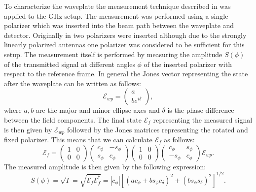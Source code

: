 To characterize the waveplate the measurement technique described in \cite{Masson2006} was applied to the GHz setup. The measurement was performed using a single polarizer which was inserted into the beam path between the waveplate and detector. Originally in \cite{Masson2006} two polarizers were inserted although due to the strongly linearly polarized antennas one polarizer was considered to be sufficient for this setup. The measurement itself is performed by measuring the amplitude $S(\phi)$ of the transmitted signal at different angles $\phi$ of the inserted polarizer with respect to the reference frame. In general the Jones vector representing the state after the waveplate can be written as follows:
\begin{equation}
    \bm{\mathcal{E}}_{wp}= 
    \begin{pmatrix}
    a \\
    be^{i\delta}
    \end{pmatrix},
\end{equation}
where $a,b$ are the major and minor ellipse axes and $\delta$ is the phase difference between the field components. The final state $\bm{\mathcal{E}}_{f}$ representing the measured signal is then given by $\bm{\mathcal{E}}_{wp}$ followed by the Jones matrices representing the rotated and fixed polarizer. This means that we can calculate $\bm{\mathcal{E}}_{f}$ as follows:
\begin{equation}
    \bm{\mathcal{E}}_{f}= 
    \begin{pmatrix}
        1 & 0\\
        0 & 0
    \end{pmatrix}
    \begin{pmatrix}
        c_{\phi} & -s_{\phi}\\
        s_{\phi} & c_{\phi}
    \end{pmatrix}
    \begin{pmatrix}
        1 & 0\\
        0 & 0
    \end{pmatrix}
    \begin{pmatrix}
        c_{\phi} & s_{\phi}\\
        -s_{\phi} & c_{\phi}
    \end{pmatrix}
    \bm{\mathcal{E}}_{wp}.
\end{equation}
The measured amplitude is then given by the following expression:
\begin{equation}
    S(\phi)=\sqrt{I} = \sqrt{\bm{\mathcal{E}}_{f} \bm{\mathcal{E}}_{f}^{\dagger}} = |c_{\phi}|\left[(ac_{\phi}+bs_{\phi}c_{\delta})^2 + (bs_{\phi}s_{\delta})^2\right]^{1/2}.
    \label{eq:ampl_fit_func}
\end{equation}
